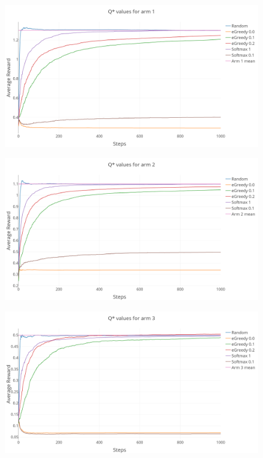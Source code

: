 \documentclass[a4paper, 11pt]{article}
\begin{document}
\begin{figure}[H]
	\centering
    \includegraphics[width=1\linewidth]{ex1_2_Q1_reward}
\end{figure}

\begin{figure}[H]
	\centering
    \includegraphics[width=1\linewidth]{ex1_2_Q2_reward}
\end{figure}

\begin{figure}[H]
	\centering
    \includegraphics[width=1\linewidth]{ex1_2_Q3_reward}
\end{figure}
\end{document}
